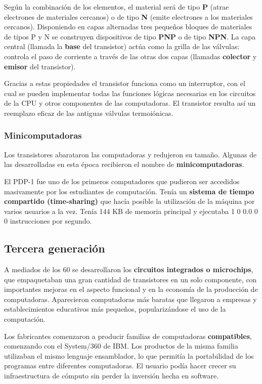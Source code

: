 \documentclass[spanish,A4,]{article}
\begin{document}
Según la combinación de los elementos, el material será de tipo
\textbf{P} (atrae electrones de materiales cercanos) o de tipo
\textbf{N} (emite electrones a los materiales cercanos). Disponiendo en
capas alternadas tres pequeños bloques de materiales de tipos P y N se
construyen dispositivos de tipo \textbf{PNP} o de tipo \textbf{NPN}. La
capa central (llamada la \textbf{base} del transistor) actúa como la
grilla de las válvulas: controla el paso de corriente a través de las
otras dos capas (llamadas \textbf{colector} y \textbf{emisor} del
transistor).

Gracias a estas propiedades el transistor funciona como un interruptor,
con el cual se pueden implementar todas las funciones lógicas necesarias
en los circuitos de la CPU y otros componentes de las computadoras. El
transistor resulta así un reemplazo eficaz de las antiguas válvulas
termoiónicas.

\subsubsection{Minicomputadoras}\label{minicomputadoras}

Los transistores abarataron las computadoras y redujeron su tamaño.
Algunas de las desarrolladas en esta época recibieron el nombre de
\textbf{minicomputadoras}.

El PDP-1 fue uno de los primeros computadores que pudieron ser accedidos
masivamente por los estudiantes de computación. Tenía un \textbf{sistema
de tiempo compartido (time-sharing)} que hacía posible la utilización de
la máquina por varios usuarios a la vez. Tenía 144 KB de memoria
principal y ejecutaba 1 0 0.0 0 0 instrucciones por segundo.

\subsection{Tercera generación}\label{tercera-generaciuxf3n}

A mediados de los 60 se desarrollaron los \textbf{circuitos integrados o
microchips}, que empaquetaban una gran cantidad de transistores en un
solo componente, con importantes mejoras en el aspecto funcional y en la
economía de la producción de computadoras. Aparecieron computadoras más
baratas que llegaron a empresas y establecimientos educativos más
pequeños, popularizándose el uso de la computación.

Los fabricantes comenzaron a producir familias de computadoras
\textbf{compatibles}, comenzando con el System/360 de IBM. Los productos
de la misma familia utilizaban el mismo lenguaje ensamblador, lo que
permitía la portabilidad de los programas entre diferentes computadoras.
El usuario podía hacer crecer su infraestructura de cómputo sin perder
la inversión hecha en software.
\end{document}
